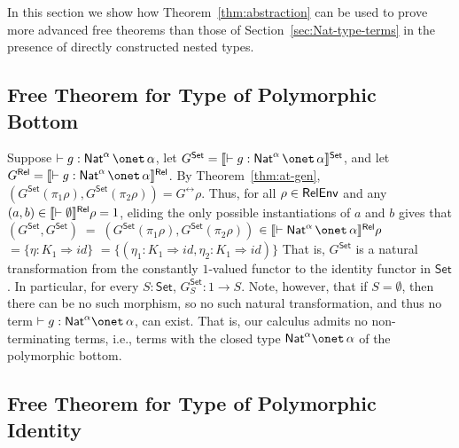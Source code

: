 \documentclass[runningheads]{llncs}
\newcommand{\set}{\mathsf{Set}}
\renewcommand{\id}{\mathit{id}}
\renewcommand{\id}{\mathit{id}}
\begin{document}
In this section we show how Theorem~\ref{thm:abstraction} can be used
to prove more advanced free theorems than those of
Section~\ref{sec:Nat-type-terms} in the presence of directly
constructed nested types.

\subsection{Free Theorem for Type of Polymorphic
  Bottom}\label{sec:bottom} 

Suppose $ \vdash g : \Nat^\alpha \,\onet\,\alpha$, let $G^\set =
\setsem{\vdash g : \Nat^\alpha \,\onet\,\alpha}$, and let $G^\rel =
\relsem{\vdash g : \Nat^\alpha \,\onet\,\alpha}$.  By
Theorem~\ref{thm:at-gen}, $(G^\set(\pi_1\rho),G^\set(\pi_2\rho))
= G^\rel\rho$. Thus, for all $\rho \in \mathsf{RelEnv}$ and any $(a, b) \in
\llbracket{\vdash \emptyset}\rrbracket^{\mathsf{Rel}}\rho = 1$, eliding the only possible
instantiations of $a$ and $b$ gives that
$(G^\set,G^\set) \;= \; (G^\set(\pi_1 \rho), G^\set (\pi_2 \rho))$
$ \in  \relsem{\vdash \Nat^\alpha \,\onet\,\alpha}\rho$
$ =  \{\eta : K_1 \Rightarrow \id\}$
$ =  \{(\eta_1 : K_1 \Rightarrow \id, \eta_2 : K_1 \Rightarrow
\id)\}$ 
That is, $G^\set$ is a natural transformation from the constantly
$1$-valued functor to the identity functor in $\set$. In particular,
for every $S : \set$, $G^\set_S : 1 \to S$. Note, however, that if $S
= \emptyset$, then there can be no such morphism, so no such natural
transformation,
and thus no term $\vdash g : \Nat^\alpha \onet \,\alpha$, can exist.
That is, our calculus admits no non-terminating terms, i.e., terms
with the closed type $\Nat^\alpha \onet \,\alpha$ of the polymorphic
bottom.

\subsection{Free Theorem for Type of Polymorphic
  Identity}\label{sec:identity} 
\end{document}
